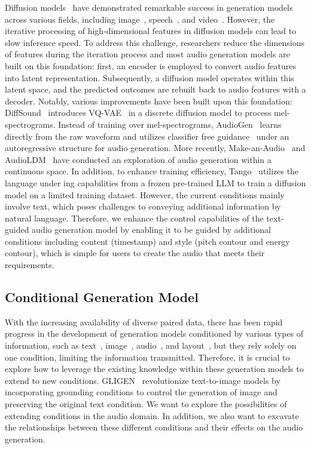 \documentclass[letterpaper]{article}
\begin{document}
Diffusion models~\cite{jonathan2020ddpm} have demonstrated remarkable success in generation models across various fields, including image~\cite{chen2020wavegrad}, speech~\cite{kong2021diffwave}, and video~\cite{singer2022makeavideo}. However, the iterative processing of high-dimensional features in diffusion models can lead to slow inference speed. To address this challenge, researchers reduce the dimensions of features during the iteration process and most audio generation models are built on this foundation: first, an encoder is employed to convert audio features into latent representation. Subsequently, a diffusion model operates within this latent space, and the predicted outcomes are rebuilt back to audio features with a decoder. Notably, various improvements have been built upon this foundation: DiffSound~\cite{yang2022diffsound} introduces VQ-VAE~\cite{van2017vqvae} in a discrete diffusion model to process mel-spectrograms. Instead of training over mel-spectrograms, AudioGen~\cite{kreuk2022audiogen} learns directly from the raw waveform and utilizes classifier free guidance~\cite{jonathan2022classfree} under an autoregressive structure for audio generation. More recently, Make-an-Audio~\cite{huang2023makeanaudio} and AudioLDM~\cite{liu2023audioldm} have conducted an exploration of audio generation within a continuous space. In addition, to enhance training efficiency, Tango~\cite{ghosal2023tango} utilizes the language under
ing capabilities from a frozen pre-trained LLM to train a diffusion model on a limited training dataset. However, the current conditions mainly involve text, which poses challenges to conveying additional information by natural language. Therefore, we enhance the control capabilities of the text-guided audio generation model by enabling it to be guided by additional conditions including content (timestamp) and style (pitch contour and energy contour), which is simple for users to create the audio that meets their requirements.

\subsection{Conditional Generation Model}

With the increasing availability of diverse paired data, there has been rapid progress in the development of generation models conditioned by various types of information, such as text~\cite{ramesh2022dalle2,liu2021diffsinger}, image~\cite{huang2023makeanaudio,li2023blip2}, audio~\cite{zelaszczyk2021audiotoimage,wang2023one}, and
layout~\cite{jahn2021highresolutioncs,li2021lama}, but they rely solely on one condition, limiting the information transmitted. Therefore, it is crucial to explore how to leverage the existing knowledge within these generation models to extend to new conditions. GLIGEN~\cite{li2023gligen} revolutionize text-to-image models by incorporating grounding conditions to control the generation of image and preserving the original text condition. We want to explore the possibilities of extending conditions in the audio domain. In addition, we also want to excavate the relationships between these different conditions and their effects on the audio generation.
\end{document}
